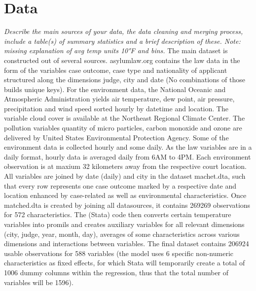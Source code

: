 \documentclass[11pt]{article}
\begin{document}
	\section{Data}
	\textit{Describe the main sources of your data, the data cleaning and merging process, include a table(s) of summary statistics and a brief description of these. Note: missing explanation of avg temp units 10°F and bins.}
	\newline
	The main dataset is constructed out of several sources. asylumlaw.org contains the law data in the form of the variables case outcome, case type and nationality of applicant structured along the dimensions judge, city and date (No combinations of those builds unique keys). For the environment data, the National Oceanic and Atmospheric Administration yields air temperature, dew point, air pressure, precipitation and wind speed sorted hourly by datetime and location. The variable cloud cover is available at the Northeast Regional Climate Center. The pollution variables quantity of micro particles, carbon monoxide and ozone are delivered by United States Environmental Protection Agency. Some of the environment data is collected hourly and some daily. As the law variables are in a daily format, hourly data is averaged daily from 6AM to 4PM. Each environment observation is at maxium 32 kilometers away from the respective court location.
	All variables are joined by date (daily) and city in the dataset machet.dta, such that every row represents one case outcome marked by a respective date and location enhanced by case-related as well as environmental characteristics. \newline
	Once matched.dta is created by joining all datasources, it contains 269269 observations for 572 characteristics. The (Stata) code then converts certain temperature variables into promils and creates auxiliary variables for all relevant dimensions (city, judge, year, month, day), averages of some characteristics across various dimensions and interactions between variables. The final dataset contains 206924 usable observations for 588 variables (the model uses 6 specific non-numeric characteristics as fixed effects, for which Stata will temporarily create a total of 1006 dummy columns within the regression, thus that the total number of variables will be 1596).
	\newline	
\end{document}
